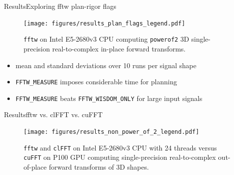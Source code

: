 \documentclass[t,11pt,hyperref={
  pdftitle = {gearshifft},
  pdfsubject = {gearshifft},
  pdfborder={0 0 0},
  colorlinks=true,
  urlcolor=red,
  citecolor=red,
  linkcolor=red,
  pdfauthor={Peter Steinbach, Matthias Werner}
  }
]{beamer}
\newcommand{\fftw}{\texttt{fftw}}
\newcommand{\cufft}{\texttt{cuFFT}}
\newcommand{\clfft}{\texttt{clFFT}}
\newcommand{\mc}[1]{\lstinline!#1!}
\begin{document}
\begin{frame}{Results}{Exploring fftw plan-rigor flags}
\begin{figure}[!htbp]\vspace{-1em}
  \centering
  \texttt{[image: figures/results\_plan\_flags\_legend.pdf]}\\[-.5em]
  \hfill
  \caption{\fftw{} on Intel E5-2680v3 CPU computing \texttt{powerof2} 3D single-precision real-to-complex in-place forward transforms.}
  \label{fig:fftw_plan_flags}
\end{figure}
\pause
\vspace{-1em}
\begin{itemize}
\item mean and standard deviations over 10 runs per signal shape
\item \mc{FFTW_MEASURE} imposes considerable time for planning
\item \mc{FFTW_MEASURE} beats \mc{FFTW_WISDOM_ONLY} for large input signals
\end{itemize}
\end{frame}


\begin{frame}{Results}{fftw vs. clFFT vs. cuFFT}
\begin{figure}[!tbp]
  \centering
  \texttt{[image: figures/results\_non\_power\_of\_2\_legend.pdf]}\\[-1em]
  \hfill
  \caption{\fftw{} and \clfft{} on Intel E5-2680v3 CPU with 24 threads versus \cufft{} on P100 GPU computing single-precision real-to-complex out-of-place forward transforms of 3D shapes.}
  \label{fig:non_power_of_2}
\end{figure}
\end{frame}
\end{document}
